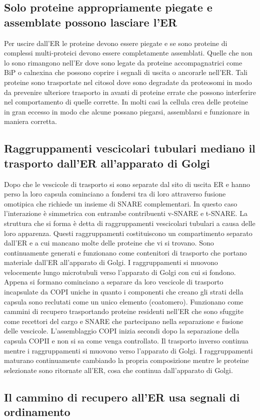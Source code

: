 \subsection{Solo proteine appropriamente piegate e assemblate possono lasciare l'ER}
Per uscire dall'ER le proteine devono essere piegate e se sono proteine di complessi multi-proteici devono essere completamente assemblati. Quelle che non lo sono rimangono nell'Er dove
sono legate da proteine accompagnatrici come BiP o calnexina che possono coprire i segnali di uscita o ancorarle nell'ER. Tali proteine sono trasportate nel citosol dove sono degradate
da proteosomi in modo da prevenire ulteriore trasporto in avanti di proteine errate che possono interferire nel comportamento di quelle corrette. In molti casi la cellula crea delle
proteine in gran eccesso in modo che alcune possano piegarsi, assemblarsi e funzionare in maniera corretta. 
\subsection{Raggruppamenti vescicolari tubulari mediano il trasporto dall'ER all'apparato di Golgi}
Dopo che le vescicole di trasporto si sono separate dal sito di uscita ER e hanno perso la loro capsula cominciano a fondersi tra di loro attraverso fusione omotipica che richiede un
insieme di SNARE complementari. In questo caso l'interazione \`e simmetrica con entrambe contribuenti v-SNARE e t-SNARE. La struttura che si forma \`e detta di raggruppamenti vescicolari
tubulari a causa delle loro apparenza. Questi raggruppamenti costituiscono un compartimento separato dall'ER e a cui mancano molte delle proteine che vi si trovano. Sono continuamente
generati e funzionano come contenitori di trasporto che portano materiale dall'ER all'apparato di Golgi. I raggruppamenti si muovono velocemente lungo microtubuli verso l'apparato di 
Golgi con cui si fondono. Appena si formano cominciano a separare da loro vescicole di trasporto  incapsulate da COPI uniche in quanto i componenti che creano gli strati della
capsula sono reclutati come un unico elemento (coatomero). Funzionano come cammini di recupero trasportando proteine residenti nell'ER che sono sfuggite come recettori del 
cargo e SNARE che partecipano nella separazione e fusione delle vescicole. L'assemblaggio COPI inizia secondi dopo la separazione della capsula COPII e non si sa come venga controllato.
Il trasporto inverso continua mentre i raggruppamenti si muovono verso l'apparato di Golgi. I raggruppamenti maturano continuamente cambiando la propria composizione mentre le proteine
selezionate sono ritornate all'ER, cosa che continua dall'apparato di Golgi. 
\subsection{Il cammino di recupero all'ER usa segnali di ordinamento}

